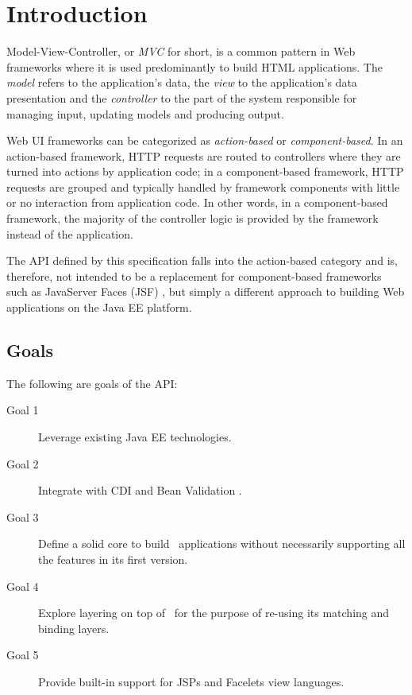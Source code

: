 \chapter{Introduction}

Model-View-Controller, or {\em MVC} for short, is a common pattern in Web frameworks 
where it is used predominantly to build HTML applications. The {\em model} refers to the 
application's data, the {\em view} to the application's data presentation and the 
{\em controller} to the part of the system responsible for managing input, updating models 
and producing output.

Web UI frameworks can be categorized as {\em action-based} or {\em component-based}. In an action-based 
framework, HTTP requests are routed to controllers where they are turned into actions by application code; 
in a component-based framework, HTTP requests are grouped and typically handled by framework components
with little or no interaction from application code. In other words, in a component-based framework,
the majority of the controller logic is provided by the framework instead of the application.

The API defined by this specification falls into the action-based 
category and is, therefore, not intended to be a replacement for component-based frameworks such as
JavaServer Faces (JSF) \cite{jsf}, but simply a different approach to building Web applications on the 
Java EE platform.

\section{Goals}
\label{goals}

The following are goals of the API:

\begin{description}
\item[Goal 1] Leverage existing Java EE technologies. 
\item[Goal 2] Integrate with CDI \cite{cdi} and Bean Validation \cite{bv}.
\item[Goal 3] Define a solid core to build \mvc\ applications without necessarily supporting all the 
features in its first version.
\item[Goal 4] Explore layering on top of \jaxrs\ for the purpose of re-using its
matching and binding layers.
\item[Goal 5] Provide built-in support for JSPs and Facelets view languages.
\end{description}

